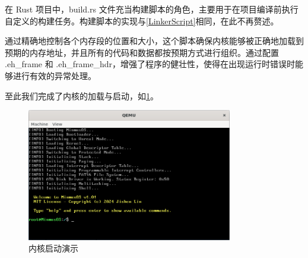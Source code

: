 在 Rust 项目中，build.rs 文件充当构建脚本的角色，主要用于在项目编译前执行自定义的构建任务。构建脚本的实现与\cref{LinkerScript}相同，在此不再赘述。

通过精确地控制各个内存段的位置和大小，这个脚本确保内核能够被正确地加载到预期的内存地址，并且所有的代码和数据都按预期方式进行组织。通过配置 .eh\_frame 和 .eh\_frame\_hdr，增强了程序的健壮性，使得在出现运行时错误时能够进行有效的异常处理。

至此我们完成了内核的加载与启动，如\cref{fig:KernelBootPresentation}。

\begin{figure}[htbp]
    \centering
    \includegraphics[width=0.8\textwidth]{figures/KernelBootPresentation.png}
    \caption{内核启动演示}
    \label{fig:KernelBootPresentation}
\end{figure}